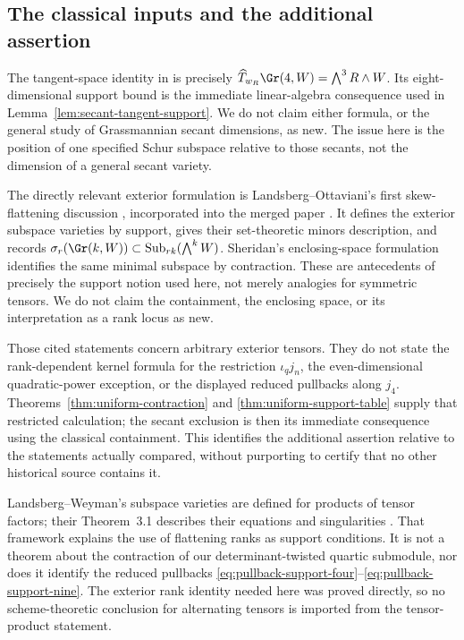 \subsection{The classical inputs and the additional assertion}

The tangent-space identity in \cite[Lemma~2.1]{Boralevi} is precisely
\(\widehat T_{w_R}\Gr(4,W)=\bigwedge^3R\wedge W\).
Its eight-dimensional support bound is the immediate linear-algebra
consequence used in Lemma~\ref{lem:secant-tangent-support}.
We do not claim either formula, or the general study of Grassmannian
secant dimensions, as new.  The issue here is the position of one
specified Schur subspace relative to those secants, not the dimension
of a general secant variety.

The directly relevant exterior formulation is
Landsberg--Ottaviani's first skew-flattening discussion
\cite[\S6.1]{LandsbergOttaviani2010}, incorporated into the merged
paper \cite[\S10.1]{LandsbergOttaviani}.  It defines the exterior
subspace varieties by support, gives their set-theoretic minors
description, and records
\(\sigma_r(\Gr(k,W))\subset\operatorname{Sub}_{rk}(\bigwedge^kW)\).
Sheridan's enclosing-space formulation
\cite[\S2.4, Definitions 2.10--2.11 in the cited preprint]{Sheridan}
identifies the same minimal subspace by contraction.  These are
antecedents of precisely the support notion used here, not merely
analogies for symmetric tensors.  We do not claim the containment,
the enclosing space, or its interpretation as a rank locus as new.

Those cited statements concern arbitrary exterior tensors.  They do
not state the rank-dependent kernel formula for the restriction
\(\iota_qj_n\), the even-dimensional quadratic-power exception,
or the displayed reduced pullbacks along \(j_4\).
Theorems~\ref{thm:uniform-contraction} and
\ref{thm:uniform-support-table} supply that restricted calculation;
the secant exclusion is then its immediate consequence using the
classical containment.  This identifies the additional assertion
relative to the statements actually compared, without purporting to
certify that no other historical source contains it.

Landsberg--Weyman's subspace varieties are defined for products of
tensor factors; their Theorem~3.1 describes their equations and
singularities \cite{LandsbergWeyman}.  That framework explains the
use of flattening ranks as support conditions.  It is not a theorem
about the contraction of our determinant-twisted quartic submodule,
nor does it identify the reduced pullbacks
\eqref{eq:pullback-support-four}--\eqref{eq:pullback-support-nine}.
The exterior rank identity needed here was proved directly, so no
scheme-theoretic conclusion for alternating tensors is imported from
the tensor-product statement.

